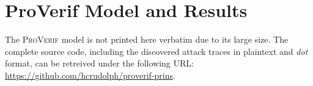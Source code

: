 \section*{ProVerif Model and Results}

The \textsc{ProVerif} model is not printed here verbatim due to its large size.
The complete source code, including the discovered attack traces in plaintext and \textit{dot} format, can be retreived under the following URL: \url{https://github.com/hcrudolph/proverif-prins}.